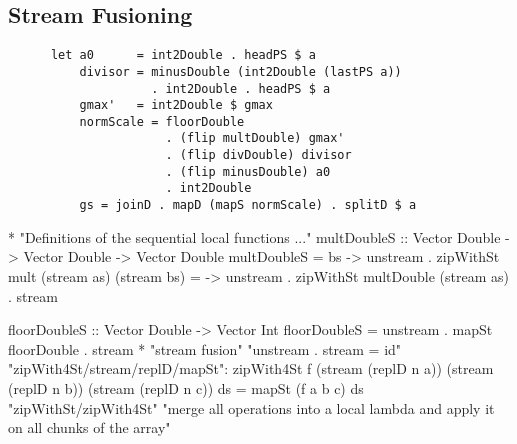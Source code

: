     \subsection{Stream Fusioning}
      \begin{lstlisting}
      let a0      = int2Double . headPS $ a 
          divisor = minusDouble (int2Double (lastPS a))
                    . int2Double . headPS $ a
          gmax'   = int2Double $ gmax
          normScale = floorDouble
                      . (flip multDouble) gmax'
                      . (flip divDouble) divisor
                      . (flip minusDouble) a0
                      . int2Double
          gs = joinD . mapD (mapS normScale) . splitD $ a
       \end{lstlisting}
       
       * "Definitions of the sequential local functions ..."
            multDoubleS :: Vector Double -> Vector Double -> Vector Double
            multDoubleS = \as bs -> unstream . zipWithSt mult (stream as) (stream bs)
              = \as -> unstream . zipWithSt multDouble (stream as) . stream

            floorDoubleS :: Vector Double -> Vector Int
            floorDoubleS = unstream . mapSt floorDouble . stream
       * "stream fusion"
           "unstream . stream = id"
           "zipWith4St/stream/replD/mapSt": zipWith4St f (stream (replD n a)) (stream (replD n b)) (stream (replD n c)) ds = mapSt (f a b c) ds
           "zipWithSt/zipWith4St"
           "merge all operations into a local lambda and apply it on all chunks of the array"
           
